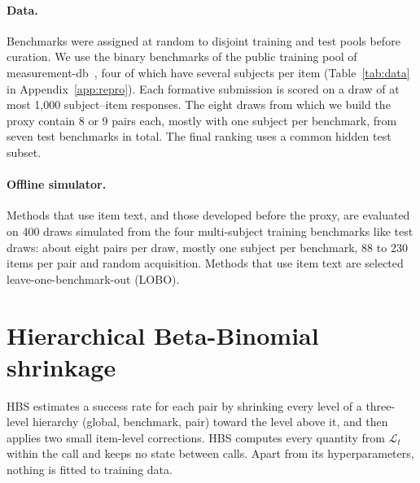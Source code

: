 \documentclass{article}
\begin{document}
\paragraph{Data.} Benchmarks were assigned at random to disjoint training and test pools before curation. We use the binary benchmarks of the public training pool of measurement-db~\citep{measurementdb}, four of which have several subjects per item (Table~\ref{tab:data} in Appendix~\ref{app:repro}). Each formative submission is scored on a draw of at most 1,000 subject--item responses. The eight draws from which we build the proxy contain 8 or 9 pairs each, mostly with one subject per benchmark, from seven test benchmarks in total. The final ranking uses a common hidden test subset.

\paragraph{Offline simulator.} Methods that use item text, and those developed before the proxy, are evaluated on 400 draws simulated from the four multi-subject training benchmarks like test draws: about eight pairs per draw, mostly one subject per benchmark, 88 to 230 items per pair and random acquisition. Methods that use item text are selected leave-one-benchmark-out (LOBO).

\section{Hierarchical Beta-Binomial shrinkage}
\label{sec:method}

HBS estimates a success rate for each pair by shrinking every level of a three-level hierarchy (global, benchmark, pair) toward the level above it, and then applies two small item-level corrections. HBS computes every quantity from $\mathcal{L}_t$ within the call and keeps no state between calls. Apart from its hyperparameters, nothing is fitted to training data.
\end{document}

